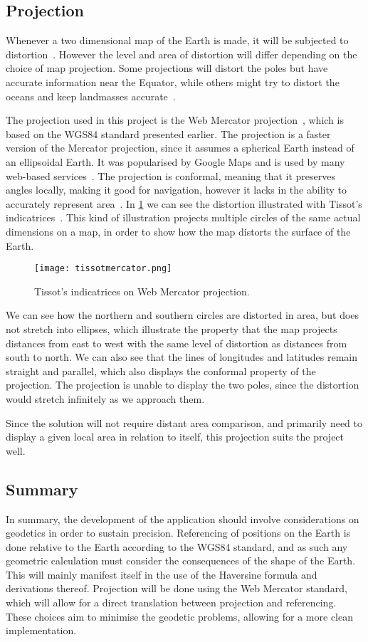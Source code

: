 \subsection{Projection}
Whenever a two dimensional map of the Earth is made, it will be subjected to distortion~\cite{projectionalbum}. However the level and area of distortion will differ depending on the choice of map projection. Some projections will distort the poles but have accurate information near the Equator, while others might try to distort the oceans and keep landmasses accurate~\cite{website:Wikipedia-mapprojections}.

The projection used in this project is the Web Mercator projection~\cite{webmercator}, which is based on the WGS84 standard presented earlier. The projection is a faster version of the Mercator projection, since it assumes a spherical Earth instead of an ellipsoidal Earth. It was popularised by Google Maps and is used by many web-based services~\cite{webmercator}. The projection is conformal, meaning that it preserves angles locally, making it good for navigation, however it lacks in the ability to accurately represent area~\cite{mercatorcritique}. In \cref{tissots} we can see the distortion illustrated with Tissot's indicatrices~\cite{tissot}. This kind of illustration projects multiple circles of the same actual dimensions on a map, in order to show how the map distorts the surface of the Earth.

\begin{figure}[htbp]
    \centering
\texttt{[image: tissotmercator.png]}
\caption{Tissot's indicatrices on Web Mercator projection.}
\label{tissots}
\end{figure}

We can see how the northern and southern circles are distorted in area, but does not stretch into ellipses, which illustrate the property that the map projects distances from east to west with the same level of distortion as distances from south to north. We can also see that the lines of longitudes and latitudes remain straight and parallel, which also displays the conformal property of the projection. The projection is unable to display the two poles, since the distortion would stretch infinitely as we approach them.

Since the solution will not require distant area comparison, and primarily need to display a given local area in relation to itself, this projection suits the project well.

\subsection{Summary}
In summary, the development of the application should involve considerations on geodetics in order to sustain precision. Referencing of positions on the Earth is done relative to the Earth according to the WGS84 standard, and as such any geometric calculation must consider the consequences of the shape of the Earth. This will mainly manifest itself in the use of the Haversine formula and derivations thereof. Projection will be done using the Web Mercator standard, which will allow for a direct translation between projection and referencing. These choices aim to minimise the geodetic problems, allowing for a more clean implementation.